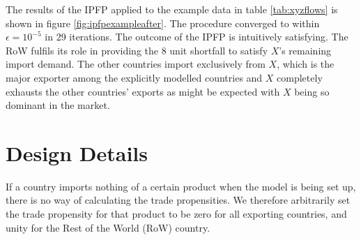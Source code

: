 \documentclass[preprint,authoryear,3p]{elsarticle}
\begin{document}
The results of the IPFP applied to the example data in table \ref{tab:xyzflows} is shown in figure \ref{fig:ipfpexampleafter}. The procedure converged to within $\epsilon=10^{-5}$ in 29 iterations. The outcome of the IPFP is intuitively satisfying. The RoW fulfils its role in providing the 8 unit shortfall to satisfy $X$'s remaining import demand. The other countries import exclusively from $X$, which is the major exporter among the explicitly modelled countries and $X$ completely exhausts the other countries' exports as might be expected with $X$ being so dominant in the market. 





\section{Design Details}
If a country imports nothing of a certain product when the model is being set up, there is no way of calculating the trade propensities. We therefore arbitrarily set the trade propensity for that product to be zero for all exporting countries, and unity for the Rest of the World (RoW) country.
\end{document}
